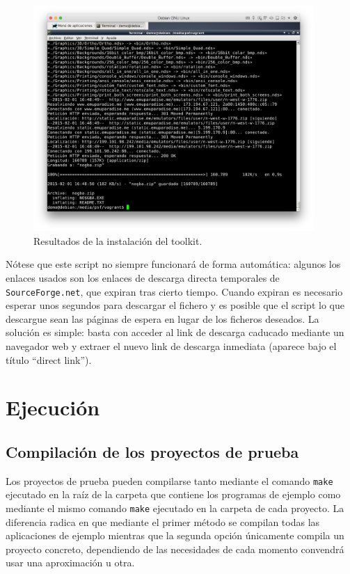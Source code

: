 \documentclass[12pt,english]{article}
\begin{document}
\begin{figure}[h!]
	\caption{Resultados de la instalación del toolkit.}
	\label{fig:dependency}
	\centering
	\includegraphics[width=0.95\textwidth]{P1Media/Toolkit}
\end{figure}

	Nótese que este script no siempre funcionará de forma automática: algunos los enlaces usados son los enlaces de descarga directa temporales de {\tt SourceForge.net}, que expiran tras cierto tiempo. Cuando expiran es necesario esperar unos segundos para descargar el fichero y es posible que el script lo que descargue sean las páginas de espera en lugar de los ficheros deseados. La solución es simple: basta con acceder al link de descarga caducado mediante un navegador web y extraer el nuevo link de descarga inmediata (aparece bajo el título ``direct link'').
	
	\newpage
	
	\section{Ejecución}
	
	\subsection{Compilación de los proyectos de prueba}
	
	Los proyectos de prueba pueden compilarse tanto mediante el comando {\tt make} ejecutado en la raíz de la carpeta que contiene los programas de ejemplo como mediante el mismo comando {\tt make} ejecutado en la carpeta de cada proyecto. La diferencia radica en que mediante el primer método se compilan todas las aplicaciones de ejemplo mientras que la segunda opción únicamente compila un proyecto concreto, dependiendo de las necesidades de cada momento convendrá usar una aproximación u otra.
	
\end{document}
